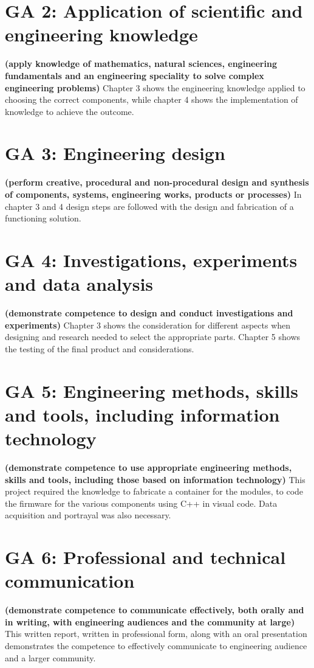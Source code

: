\section{GA 2: Application of scientific and engineering knowledge}
\textbf{(apply knowledge of mathematics, natural sciences, engineering fundamentals and an engineering speciality to solve complex engineering problems) }
Chapter 3 shows the engineering knowledge applied to choosing the correct components, while chapter 4 shows the implementation of knowledge to achieve the outcome.
\section{GA 3: Engineering design}
\textbf{(perform creative, procedural and non-procedural design and synthesis of components, systems, engineering works, products or processes) }
In chapter 3 and 4 design steps are followed with the design and fabrication of a functioning solution.

\section{GA 4: Investigations, experiments and data analysis}
\textbf{(demonstrate competence to design and conduct investigations and experiments)  }
Chapter 3 shows the consideration for different aspects when designing and research needed to select the appropriate parts. Chapter 5 shows the testing of the final product and considerations.

\section{GA 5: Engineering methods, skills and tools, including information technology}
\textbf{(demonstrate competence to use appropriate engineering methods, skills and tools, including those based on information technology) }
This project required the knowledge to fabricate a container for the modules, to code the firmware for the various components using C++ in visual code. Data acquisition and portrayal was also necessary.

\section{GA 6: Professional and technical communication}
\textbf{(demonstrate competence to communicate effectively, both orally and in writing, with engineering audiences and the community at large)  }
This written report, written in professional form, along with an oral presentation demonstrates the
competence to effectively communicate to engineering audience and a larger community.
